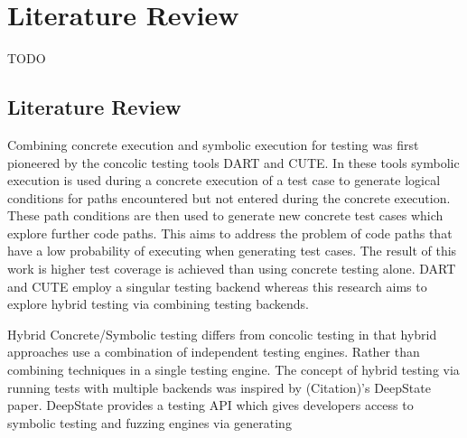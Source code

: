 \chapter{Literature Review}
\label{cha:literature_review}

TODO

  
\section{Literature Review}
\label{sec:literature_review}
Combining concrete execution and symbolic execution for testing was first pioneered by the concolic testing tools DART and CUTE. In these tools symbolic execution is used during a concrete execution of a test case to generate logical conditions for paths encountered but not entered during the concrete execution. These path conditions are then used to generate new concrete test cases which explore further code paths. This aims to address the problem of code paths that have a low probability of executing when generating test cases. The result of this work is higher test coverage is achieved than using concrete testing alone. DART and CUTE employ a singular testing backend whereas this research aims to explore hybrid testing via combining testing backends. 

Hybrid Concrete/Symbolic testing differs from concolic testing in that hybrid approaches use a combination of independent testing engines. Rather than combining techniques in a single testing engine. 
The concept of hybrid testing via running tests with multiple backends was inspired by (Citation)’s DeepState paper. DeepState provides a testing API which gives developers access to symbolic testing and fuzzing engines via generating 


